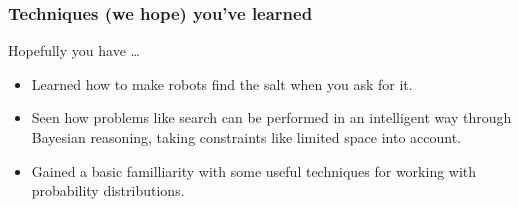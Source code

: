 \begin{frame}
  \frametitle{Techniques (we hope) you've learned}
  Hopefully you have \ldots
  \begin{itemize}
    \item Learned how to make robots find the salt when you ask for it.
    \item Seen how problems like search can be performed in an
          intelligent way through Bayesian reasoning,
          taking constraints like limited space into account.
    \item Gained a basic familliarity with some useful techniques for working with probability distributions.
  \end{itemize}
\end{frame}

